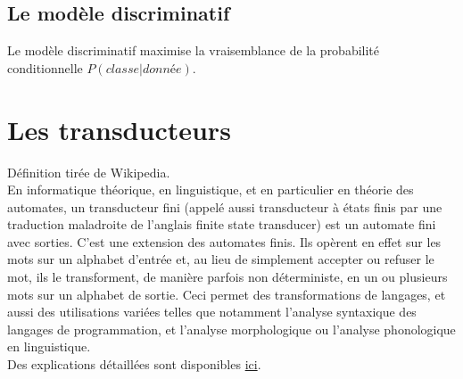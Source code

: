     \subsection{Le modèle discriminatif}
    \label{annexe:discriminatif}
        Le modèle discriminatif maximise la vraisemblance de la probabilité conditionnelle $P(classe | donnée)$.

\section{Les transducteurs}
\label{annexe:transducteurs}
    Définition\autocite{} tirée de Wikipedia.\\%

    En informatique théorique, en linguistique, et en particulier en théorie des automates, un transducteur fini (appelé aussi transducteur à états finis par une traduction maladroite de l'anglais finite state transducer) est un automate fini avec sorties. C'est une extension des automates finis. Ils opèrent en effet sur les mots sur un alphabet d'entrée et, au lieu de simplement accepter ou refuser le mot, ils le transforment, de manière parfois non déterministe, en un ou plusieurs mots sur un alphabet de sortie. Ceci permet des transformations de langages, et aussi des utilisations variées telles que notamment l'analyse syntaxique des langages de programmation, et l'analyse morphologique ou l'analyse phonologique en linguistique.\\

    Des explications détaillées sont disponibles \href{http://sixty-north.com/blog/deriving-transducers-from-first-pr}{ici}.